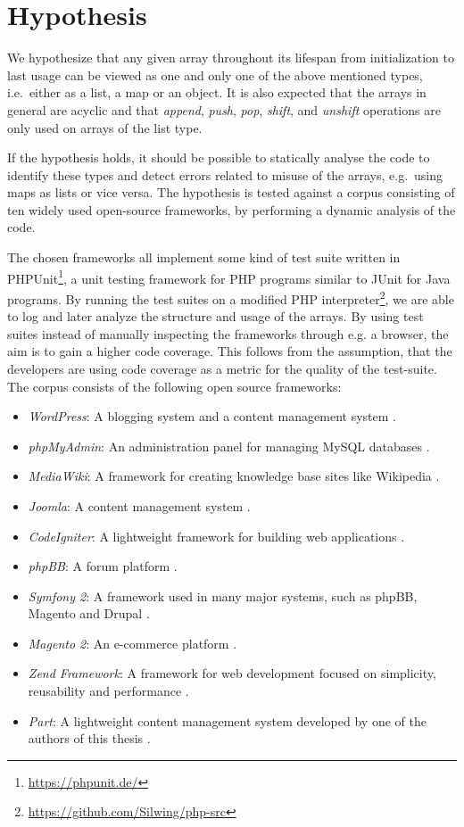 \section{Hypothesis}
\label{sec:dynhypothesis}
We hypothesize that any given array throughout its lifespan from initialization to last usage can be viewed as one and only one of the above mentioned types, i.e.\ either as a list, a map or an object. It is also expected that the arrays in general are acyclic and that \emph{append}, \textit{push}, \textit{pop}, \textit{shift}, and \textit{unshift} operations are only used on arrays of the list type.

If the hypothesis holds, it should be possible to statically analyse the code to identify these types and detect errors related to misuse of the arrays, e.g.\ using maps as lists or vice versa. The hypothesis is tested against a corpus consisting of ten widely used open-source frameworks, by performing a dynamic analysis of the code.

The chosen frameworks all implement some kind of test suite written in PHPUnit\footnote{\url{https://phpunit.de/}}, a unit testing framework for PHP programs similar to JUnit for Java programs. By running the test suites on a modified PHP interpreter\footnote{\url{https://github.com/Silwing/php-src}}, we are able to log and later analyze the structure and usage of the arrays. By using test suites instead of manually inspecting the frameworks through e.g. a browser, the aim is to gain a higher code coverage. This follows from the assumption, that the developers are using code coverage as a metric for the quality of the test-suite. The corpus consists of the following open source frameworks:

\begin{itemize}
    \item \emph{WordPress}: A blogging system and a content management system .
    \item \emph{phpMyAdmin}: An administration panel for managing MySQL databases .
    \item \emph{MediaWiki}: A framework for creating knowledge base sites like Wikipedia .
    \item \emph{Joomla}: A content management system .
    \item \emph{CodeIgniter}: A lightweight framework for building web applications .
    \item \emph{phpBB}: A forum platform .
    \item \emph{Symfony 2}: A framework used in many major systems, such as phpBB, Magento and Drupal .
    \item \emph{Magento 2}: An e-commerce platform .
    \item \emph{Zend Framework}: A framework for web development focused on simplicity, reusability and performance .
    \item \emph{Part}: A lightweight content management system developed by one of the authors of this thesis .
\end{itemize}